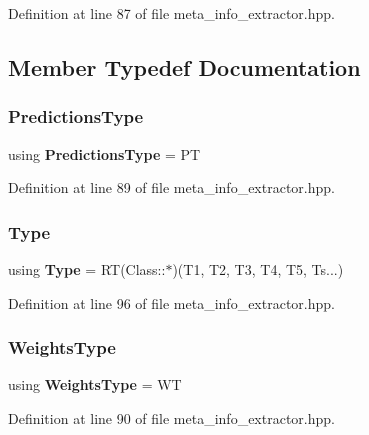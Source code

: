 Definition at line 87 of file meta\+\_\+info\+\_\+extractor.\+hpp.



\subsection{Member Typedef Documentation}
\mbox{\label{structmlpack_1_1cv_1_1TrainFormBase7_a329a0bee5f08ebbfbd6c97e4f74bdb4f}} 
\subsubsection{Predictions\+Type}
{\footnotesize\ttfamily using \textbf{ Predictions\+Type} =  PT}



Definition at line 89 of file meta\+\_\+info\+\_\+extractor.\+hpp.

\mbox{\label{structmlpack_1_1cv_1_1TrainFormBase7_aec0832f5ca5e0a962d03d3b5843bcf81}} 
\subsubsection{Type}
{\footnotesize\ttfamily using \textbf{ Type} =  RT(Class\+::$\ast$)(T1, T2, T3, T4, T5, Ts...)}



Definition at line 96 of file meta\+\_\+info\+\_\+extractor.\+hpp.

\mbox{\label{structmlpack_1_1cv_1_1TrainFormBase7_aecfc3bfd62796ddd9feb857c898cefa8}} 
\subsubsection{Weights\+Type}
{\footnotesize\ttfamily using \textbf{ Weights\+Type} =  WT}



Definition at line 90 of file meta\+\_\+info\+\_\+extractor.\+hpp.



